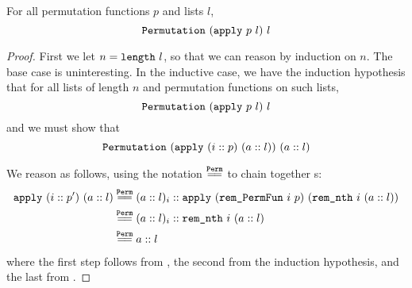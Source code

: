 \documentclass[11pt]{thesis}
\begin{document}
\begin{theorem}
  For all permutation functions $p$ and lists $l$,
  \begin{equation*}
    \texttt{Permutation}~(\texttt{apply}~p~l)~l
  \end{equation*}
\end{theorem}
\begin{proof}
  First we let $n = \texttt{length}~l$, so that we can reason by
  induction on $n$. The base case is uninteresting. In the inductive
  case, we have the induction hypothesis that for all lists of length
  $n$ and permutation functions on such lists,
  \begin{equation*}
    \texttt{Permutation}~(\texttt{apply}~p~l)~l
  \end{equation*}
  and we must show that
  \begin{equation*}
    \texttt{Permutation}~(\texttt{apply}~(i :: p)~(a :: l))~(a :: l)
  \end{equation*}

  We reason as follows, using the notation $\eqperm$ to
  chain together s:
  \begin{align*}
    \var{apply}~(i :: p')~(a :: l) &\eqperm
    (a :: l)_i :: \var{apply}~(\var{rem\_PermFun}~i~p)~(\var{rem\_nth}~i~(a::l)) \\
    &\eqperm (a :: l)_i :: \var{rem\_nth}~i~(a::l) \\
    &\eqperm a :: l
  \end{align*}
  where the first step follows from , the
  second from the induction hypothesis, and the last from
  .
\end{proof}
\end{document}
